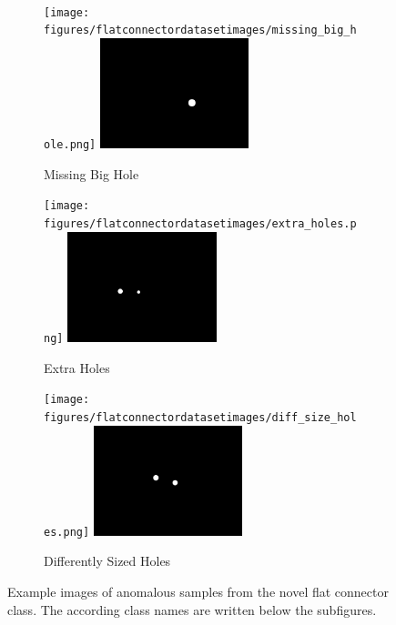 \begin{figure}[ht]
\begin{subfigure}[b]{0.3\textwidth}
    \end{subfigure}
    \\
    \begin{subfigure}[b]{0.3\textwidth}
        \centering
        \texttt{[image: figures/flatconnectordatasetimages/missing\_big\_hole.png]}
        \includegraphics[width=0.475\textwidth]{figures/flatconnectordatasetimages/missing_big_hole_mask.png}
        \caption*{Missing Big Hole}

    \end{subfigure}
    \hfill
    \begin{subfigure}[b]{0.3\textwidth}
        \centering
        \texttt{[image: figures/flatconnectordatasetimages/extra\_holes.png]}
        \includegraphics[width=0.475\textwidth]{figures/flatconnectordatasetimages/extra_holes_mask.png}
        \caption*{Extra Holes}

    \end{subfigure}
    \hfill
    \begin{subfigure}[b]{0.3\textwidth}
        \centering
        \texttt{[image: figures/flatconnectordatasetimages/diff\_size\_holes.png]}
        \includegraphics[width=0.475\textwidth]{figures/flatconnectordatasetimages/diff_size_holes_mask.png}
        \caption*{Differently Sized Holes}

    \end{subfigure}
    \caption{Example images of anomalous samples from the novel flat connector class. The according class names are written below the subfigures.}
    \label{fig:flatconnectorexampleimages}
\end{figure}


